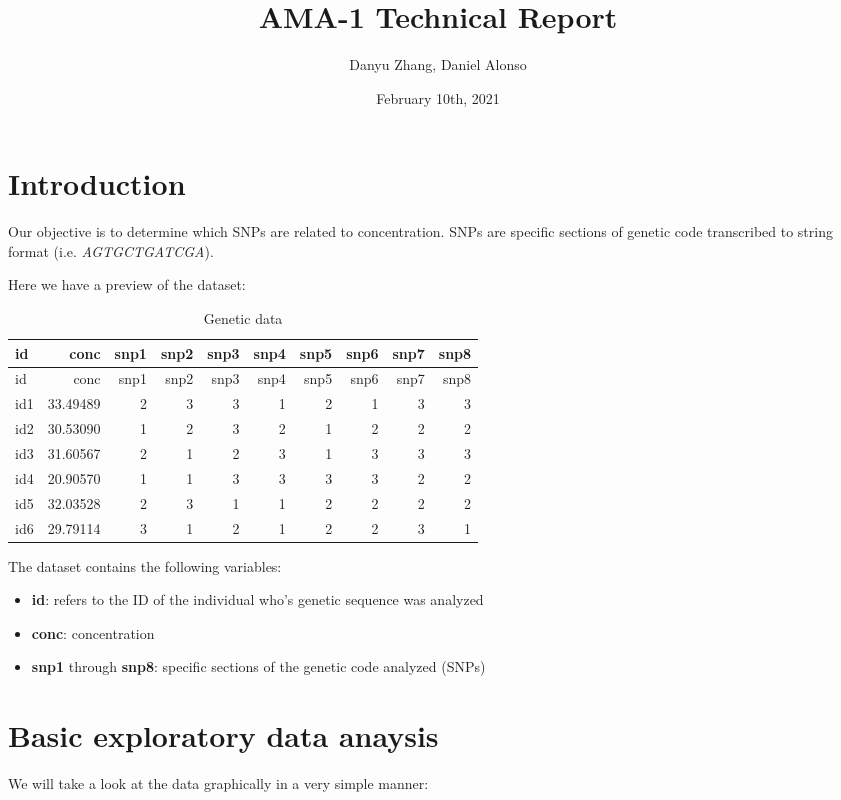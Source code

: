 \documentclass[]{article}
\title{AMA-1 Technical Report}
\author{Danyu Zhang, Daniel Alonso}
\date{February 10th, 2021}
\providecommand{\tightlist}{%
  \setlength{\itemsep}{0pt}\setlength{\parskip}{0pt}}
\begin{document}
\maketitle

\hypertarget{introduction}{%
\section{Introduction}\label{introduction}}

Our objective is to determine which SNPs are related to concentration.
SNPs are specific sections of genetic code transcribed to string format
(i.e. \emph{AGTGCTGATCGA}).

Here we have a preview of the dataset:

\begin{longtable}[]{@{}lrrrrrrrrr@{}}
\caption{Genetic data}\tabularnewline
\toprule
id & conc & snp1 & snp2 & snp3 & snp4 & snp5 & snp6 & snp7 &
snp8\tabularnewline
\midrule
\endfirsthead
\toprule
id & conc & snp1 & snp2 & snp3 & snp4 & snp5 & snp6 & snp7 &
snp8\tabularnewline
\midrule
\endhead
id1 & 33.49489 & 2 & 3 & 3 & 1 & 2 & 1 & 3 & 3\tabularnewline
id2 & 30.53090 & 1 & 2 & 3 & 2 & 1 & 2 & 2 & 2\tabularnewline
id3 & 31.60567 & 2 & 1 & 2 & 3 & 1 & 3 & 3 & 3\tabularnewline
id4 & 20.90570 & 1 & 1 & 3 & 3 & 3 & 3 & 2 & 2\tabularnewline
id5 & 32.03528 & 2 & 3 & 1 & 1 & 2 & 2 & 2 & 2\tabularnewline
id6 & 29.79114 & 3 & 1 & 2 & 1 & 2 & 2 & 3 & 1\tabularnewline
\bottomrule
\end{longtable}

The dataset contains the following variables:

\begin{itemize}
\tightlist
\item
  \textbf{id}: refers to the ID of the individual who's genetic sequence
  was analyzed
\item
  \textbf{conc}: concentration
\item
  \textbf{snp1} through \textbf{snp8}: specific sections of the genetic
  code analyzed (SNPs)
\end{itemize}

\hypertarget{basic-exploratory-data-anaysis}{%
\section{Basic exploratory data
anaysis}\label{basic-exploratory-data-anaysis}}

We will take a look at the data graphically in a very simple manner:
\end{document}
